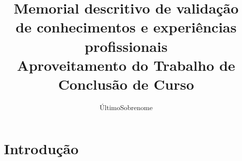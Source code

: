 \documentclass[memorial,capa]{texifsap}
\title{Memorial descritivo de valida\c{c}\~ao de conhecimentos e experi\^encias profissionais\\[.5cm]Aproveitamento do Trabalho de Conclus\~ao de Curso}
\author{ÚltimoSobrenome}{Primeiro nome e sobrenome}
\begin{document}
\maketitle

\sloppy

\tableofcontents




\chapter{Introdução}

\end{document}
